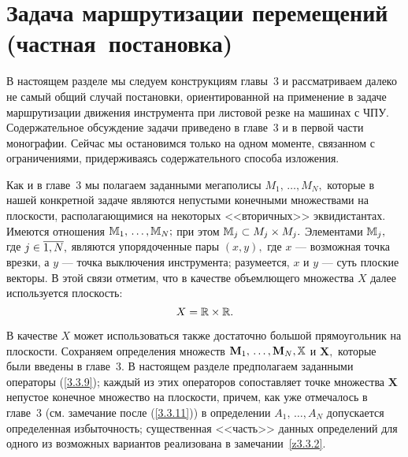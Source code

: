 
\section{
  Задача маршрутизации перемещений
  (частная~постановка)
}
\label{sect:5.2}
\setcounter{equation}{0}

В настоящем разделе мы следуем конструкциям главы~3
и рассматриваем далеко не самый общий случай постановки,
ориентированной на применение в задаче маршрутизации
движения инструмента при листовой резке на машинах с ЧПУ.
Содержательное обсуждение задачи приведено в главе~3
и в первой части монографии.
Сейчас мы остановимся только на одном моменте,
связанном с ограничениями,
придерживаясь содержательного способа изложения.


Как и в главе~3
мы полагаем заданными мегаполисы
$M_1,\,\ldots,M_N,$
которые в нашей конкретной задаче являются непустыми конечными множествами на плоскости,
располагающимися на некоторых <<вторичных>> эквидистантах.
Имеются отношения
$\bbm_1,\,\ldots,\bbm_N;$
при этом ${\mathbb M}_j\subset M_j\times M_j.$
Элементами
${\mathbb M}_j,$ где $j\in \ov{1,N},$
являются упорядоченные пары $(x,y),$
где $x$ --- возможная точка врезки,
а $y$ --- точка выключения инструмента;
разумеется, $x$
и $y$ --- суть плоские векторы.
В этой связи отметим, что в качестве объемлющего
множества $X$ далее используется плоскость:
$$
  X = {\mathbb R}\times {\mathbb R}
  .
$$

В качестве $X$
может использоваться также достаточно большой прямоугольник на плоскости.
Сохраняем определения множеств
$\mathbf{M}_1,\,\ldots,\mathbf{M}_N, \bbx$
и $\mathbf{X},$
которые были введены в главе~3.
В настоящем разделе предполагаем заданными операторы (\ref{3.3.9});
каждый из этих операторов сопоставляет точке множества $\mathbf{X}$
непустое конечное множество на плоскости,
причем, как уже отмечалось в главе~3
(см. замечание после (\ref{3.3.11}))
в определении $A_1,\,\ldots,A_N$
допускается определенная избыточность;
существенная <<часть>> данных определений
для одного из возможных вариантов реализована в замечании~\ref{z3.3.2}.

